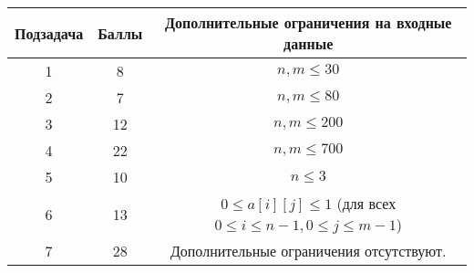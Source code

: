 \begin{center}
\renewcommand{\arraystretch}{1.5}
\begin{tabular}{|c|c|c|}
\hline
Подзадача & Баллы & Дополнительные ограничения на входные данные\\
\hline
1 & 8 & $n, m \leq 30$ \\
\hline
2 & 7 & $n, m \leq 80$ \\
\hline
3 & 12 & $n, m \leq 200$ \\
\hline
4 & 22 & $n, m \leq 700$ \\
\hline
5 & 10 & $n \leq 3$ \\
\hline
6 & 13 & $0 \leq a[i][j] \leq 1$ (для всех $0 \leq i \leq n-1, 0 \leq j \leq m-1$) \\
\hline
7 & 28 &  Дополнительные ограничения отсутствуют. \\
\hline
\end{tabular}
\end{center}
